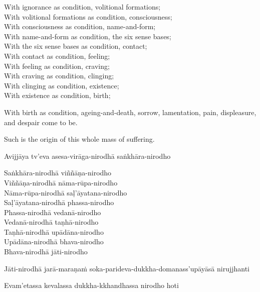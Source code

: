 \ifbfive\clearpage\fi

\begin{english-verses}
  With ignorance as condition, volitional formations;\\
  With volitional formations as condition, consciousness;\\
  With consciousness as condition, name-and-form;\\
  With name-and-form as condition, the six sense bases;\\
  With the six sense bases as condition, contact;\\
  With contact as condition, feeling;\\
  With feeling as condition, craving;\\
  With craving as condition, clinging;\\
  With clinging as condition, existence;\\
  With existence as condition, birth;
  \begin{english-hang-together-verses}
    With birth as condition, ageing-and-death, sorrow, lamentation, pain, displeasure, and despair come to be.
  \end{english-hang-together-verses}
  \begin{english-hang-together-verses}
    Such is the origin of this whole mass of suffering.
  \end{english-hang-together-verses}
\end{english-verses}

\begin{pali-hang-continued}
  \begin{pali-hang-first-line}
  Avijjāya tv'eva asesa-virāga-nirodhā saṅkhāra-nirodho\\
  \end{pali-hang-first-line}
  Saṅkhāra-nirodhā viññāṇa-nirodho\\
  Viññāṇa-nirodhā nāma-rūpa-nirodho\\
  Nāma-rūpa-nirodhā saḷ'āyatana-nirodho\\
  Saḷ'āyatana-nirodhā phassa-nirodho\\
  Phassa-nirodhā vedanā-nirodho\\
  Vedanā-nirodhā taṇhā-nirodho\\
  Taṇhā-nirodhā upādāna-nirodho\\
  Upādāna-nirodhā bhava-nirodho\\
  Bhava-nirodhā jāti-nirodho
  \begin{pali-hang-together}
    Jāti-nirodhā jarā-maraṇaṁ soka-parideva-dukkha-domanass'upāyāsā nirujjhanti
  \end{pali-hang-together}
  \begin{pali-hang-together}
    Evam'etassa kevalassa dukkha-kkhandhassa nirodho hoti
  \end{pali-hang-together}
\end{pali-hang-continued}

